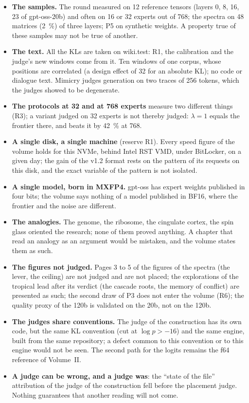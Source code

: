 \begin{faux}
\begin{itemize}
\item \textbf{The samples.} The round measured on 12 reference tensors (layers 0, 8, 16, 23 of gpt-oss-20b) and often on 16 or 32 experts out of 768; the spectra on 48 matrices (\SI{2}{\percent}) of three layers; P5 on synthetic weights. A property true of these samples may not be true of another.
\item \textbf{The text.} All the KLs are taken on wiki.test: R1, the calibration and the judge's new windows come from it. Ten windows of one corpus, whose positions are correlated (a design effect of 32 for an absolute KL); no code or dialogue text. Mimicry judges generation on two traces of 256 tokens, which the judges showed to be degenerate.
\item \textbf{The protocols at 32 and at 768 experts} measure two different things (R3); a variant judged on 32 experts is not thereby judged: $\lambda = 1$ equals the frontier there, and beats it by \SI{42}{\percent} at 768.
\item \textbf{A single disk, a single machine} (reserve R1). Every speed figure of the volume holds for this NVMe, behind Intel RST VMD, under BitLocker, on a given day; the gain of the v1.2 format rests on the pattern of its requests on this disk, and the exact variable of the pattern is not isolated.
\item \textbf{A single model, born in MXFP4.} gpt-oss has expert weights published in four bits; the volume says nothing of a model published in BF16, where the frontier and the noise are different.
\item \textbf{The analogies.} The genome, the ribosome, the cingulate cortex, the spin glass oriented the research; none of them proved anything. A chapter that read an analogy as an argument would be mistaken, and the volume states them as such.
\item \textbf{The figures not judged.} Pages 3 to 5 of the figures of the spectra (the lever, the ceiling) are not judged and are not placed; the explorations of the tropical lead after its verdict (the cascade roots, the memory of conflict) are presented as such; the second draw of P3 does not enter the volume (R6); the quality proxy of the 120b is validated on the 20b, not on the 120b.
\item \textbf{The judges share conventions.} The judge of the construction has its own code, but the same KL convention (cut at $\log p > -16$) and the same engine, built from the same repository; a defect common to this convention or to this engine would not be seen. The second path for the logits remains the f64 reference of Volume~II.
\item \textbf{A judge can be wrong, and a judge was}: the ``state of the file'' attribution of the judge of the construction fell before the placement judge. Nothing guarantees that another reading will not come.
\end{itemize}
\end{faux}

